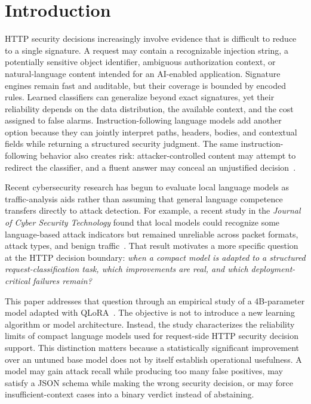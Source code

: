 \section{Introduction}
\label{sec:introduction}

HTTP security decisions increasingly involve evidence that is difficult to reduce to a single signature. A request may contain a recognizable injection string, a potentially sensitive object identifier, ambiguous authorization context, or natural-language content intended for an AI-enabled application. Signature engines remain fast and auditable, but their coverage is bounded by encoded rules. Learned classifiers can generalize beyond exact signatures, yet their reliability depends on the data distribution, the available context, and the cost assigned to false alarms. Instruction-following language models add another option because they can jointly interpret paths, headers, bodies, and contextual fields while returning a structured security judgment. The same instruction-following behavior also creates risk: attacker-controlled content may attempt to redirect the classifier, and a fluent answer may conceal an unjustified decision~\citep{perez2022promptinject,greshake2023indirect,schulhoff2023hackaprompt}.

Recent cybersecurity research has begun to evaluate local language models as traffic-analysis aids rather than assuming that general language competence transfers directly to attack detection. For example, a recent study in the \emph{Journal of Cyber Security Technology} found that local models could recognize some language-based attack indicators but remained unreliable across packet formats, attack types, and benign traffic~\citep{paukkeri2026local}. That result motivates a more specific question at the HTTP decision boundary: \emph{when a compact model is adapted to a structured request-classification task, which improvements are real, and which deployment-critical failures remain?}

This paper addresses that question through an empirical study of a 4B-parameter model adapted with QLoRA~\citep{hu2021lora,dettmers2023qlora}. The objective is not to introduce a new learning algorithm or model architecture. Instead, the study characterizes the reliability limits of compact language models used for request-side HTTP security decision support. This distinction matters because a statistically significant improvement over an untuned base model does not by itself establish operational usefulness. A model may gain attack recall while producing too many false positives, may satisfy a JSON schema while making the wrong security decision, or may force insufficient-context cases into a binary verdict instead of abstaining.

